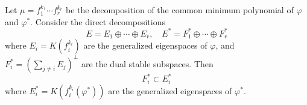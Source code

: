 Let $\mu = f_1^{k_1} \cdots f_r^{k_r}$ be the decomposition of the common minimum polynomial of $\varphi$ and $\varphi^*$. Consider the direct decompositions
$$E = E_1 \oplus \cdots \oplus E_r, \quad E^* = F_1^* \oplus \cdots \oplus F_r^*$$
where $E_i = K(f_i^{k_i})$ are the generalized eigenspaces of $\varphi$, and $F_i^* = (\sum_{j \neq i} E_j)^\perp$ are the dual stable subspaces. Then
$$F_i^* \subset E_i^*$$
where $E_i^* = K(f_i^{k_i}(\varphi^*))$ are the generalized eigenspaces of $\varphi^*$.
